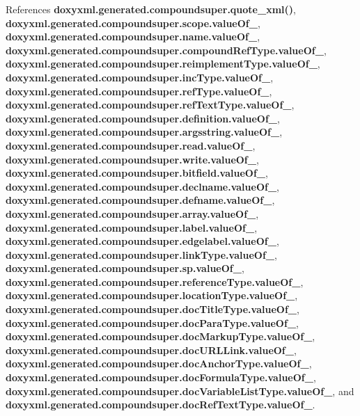 References {\bf doxyxml.\+generated.\+compoundsuper.\+quote\+\_\+xml()}, {\bf doxyxml.\+generated.\+compoundsuper.\+scope.\+value\+Of\+\_\+}, {\bf doxyxml.\+generated.\+compoundsuper.\+name.\+value\+Of\+\_\+}, {\bf doxyxml.\+generated.\+compoundsuper.\+compound\+Ref\+Type.\+value\+Of\+\_\+}, {\bf doxyxml.\+generated.\+compoundsuper.\+reimplement\+Type.\+value\+Of\+\_\+}, {\bf doxyxml.\+generated.\+compoundsuper.\+inc\+Type.\+value\+Of\+\_\+}, {\bf doxyxml.\+generated.\+compoundsuper.\+ref\+Type.\+value\+Of\+\_\+}, {\bf doxyxml.\+generated.\+compoundsuper.\+ref\+Text\+Type.\+value\+Of\+\_\+}, {\bf doxyxml.\+generated.\+compoundsuper.\+definition.\+value\+Of\+\_\+}, {\bf doxyxml.\+generated.\+compoundsuper.\+argsstring.\+value\+Of\+\_\+}, {\bf doxyxml.\+generated.\+compoundsuper.\+read.\+value\+Of\+\_\+}, {\bf doxyxml.\+generated.\+compoundsuper.\+write.\+value\+Of\+\_\+}, {\bf doxyxml.\+generated.\+compoundsuper.\+bitfield.\+value\+Of\+\_\+}, {\bf doxyxml.\+generated.\+compoundsuper.\+declname.\+value\+Of\+\_\+}, {\bf doxyxml.\+generated.\+compoundsuper.\+defname.\+value\+Of\+\_\+}, {\bf doxyxml.\+generated.\+compoundsuper.\+array.\+value\+Of\+\_\+}, {\bf doxyxml.\+generated.\+compoundsuper.\+label.\+value\+Of\+\_\+}, {\bf doxyxml.\+generated.\+compoundsuper.\+edgelabel.\+value\+Of\+\_\+}, {\bf doxyxml.\+generated.\+compoundsuper.\+link\+Type.\+value\+Of\+\_\+}, {\bf doxyxml.\+generated.\+compoundsuper.\+sp.\+value\+Of\+\_\+}, {\bf doxyxml.\+generated.\+compoundsuper.\+reference\+Type.\+value\+Of\+\_\+}, {\bf doxyxml.\+generated.\+compoundsuper.\+location\+Type.\+value\+Of\+\_\+}, {\bf doxyxml.\+generated.\+compoundsuper.\+doc\+Title\+Type.\+value\+Of\+\_\+}, {\bf doxyxml.\+generated.\+compoundsuper.\+doc\+Para\+Type.\+value\+Of\+\_\+}, {\bf doxyxml.\+generated.\+compoundsuper.\+doc\+Markup\+Type.\+value\+Of\+\_\+}, {\bf doxyxml.\+generated.\+compoundsuper.\+doc\+U\+R\+L\+Link.\+value\+Of\+\_\+}, {\bf doxyxml.\+generated.\+compoundsuper.\+doc\+Anchor\+Type.\+value\+Of\+\_\+}, {\bf doxyxml.\+generated.\+compoundsuper.\+doc\+Formula\+Type.\+value\+Of\+\_\+}, {\bf doxyxml.\+generated.\+compoundsuper.\+doc\+Variable\+List\+Type.\+value\+Of\+\_\+}, and {\bf doxyxml.\+generated.\+compoundsuper.\+doc\+Ref\+Text\+Type.\+value\+Of\+\_\+}.



